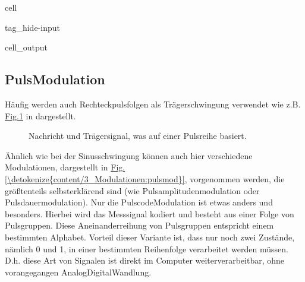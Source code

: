 \documentclass[letterpaper,10pt,english]{jupyterBook}
\let\sphinxpxdimen\pdfpxdimen\else\newdimen\sphinxpxdimen
\begin{document}
\begin{sphinxuseclass}{cell}
\begin{sphinxuseclass}{tag_hide-input}\begin{sphinxVerbatimOutput}

\begin{sphinxuseclass}{cell_output}
\noindent{}

\end{sphinxuseclass}\end{sphinxVerbatimOutput}

\end{sphinxuseclass}
\end{sphinxuseclass}

\subsection{Puls\sphinxhyphen{}Modulation}
\label{\detokenize{content/3_Modulationen:puls-modulation}}
\sphinxAtStartPar
Häufig werden auch Rechteckpulsfolgen als Trägerschwingung verwendet wie z.B. \hyperref[\detokenize{content/3_Modulationen:puls-trager}]{Fig.\@ \ref{\detokenize{content/3_Modulationen:puls-trager}}} in dargestellt.

\begin{figure}[htbp]
\centering
\capstart

\noindent\sphinxincludegraphics[width=600\sphinxpxdimen]{{puls_träger}.jpg}
\caption{Nachricht und Trägersignal, was auf einer Pulsreihe basiert.}\label{\detokenize{content/3_Modulationen:puls-trager}}\end{figure}

\sphinxAtStartPar
Ähnlich wie bei der Sinusschwingung können auch hier verschiedene Modulationen, dargestellt in \hyperref[\detokenize{content/3_Modulationen:pulsmod}]{Fig.\@ \ref{\detokenize{content/3_Modulationen:pulsmod}}},  vorgenommen werden, die größtenteils selbsterklärend sind (wie Pulsamplitudenmodulation oder Pulsdauermodulation). Nur die Pulscode\sphinxhyphen{}Modulation ist etwas anders und besonders. Hierbei wird das Messsignal kodiert und besteht aus einer Folge von Pulsgruppen. Diese Aneinanderreihung von Pulsgruppen entspricht einem bestimmten Alphabet. Vorteil dieser Variante ist, dass nur noch zwei Zustände, nämlich 0 und 1, in einer bestimmten Reihenfolge verarbeitet werden müssen. D.h. diese Art von Signalen ist direkt im Computer weiterverarbeitbar, ohne vorangegangen Analog\sphinxhyphen{}Digital\sphinxhyphen{}Wandlung.
\end{document}
